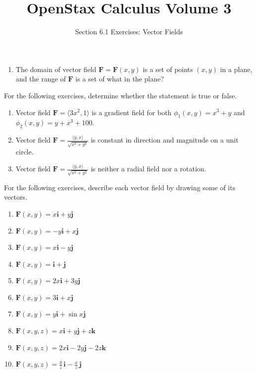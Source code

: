 \documentclass{exercises}
\title{OpenStax Calculus Volume 3}
\subtitle{Section 6.1 Exercises: Vector Fields}
\author{}
\date{}
\begin{document}
\maketitle

\begin{enumerate}[start=1]
\item The domain of vector field $\mathbf{F}=\mathbf{F}(x,y)$ is a set of points $(x,y)$ in a plane, and the range of $\mathbf{F}$ is a set of what in the plane?
\end{enumerate}

For the following exercises, determine whether the statement is true or false.

\begin{enumerate}[resume]
\item Vector field $\mathbf{F}=\langle3x^{2},1\rangle$ is a gradient field for both $\phi_{1}(x,y)=x^{3}+y$ and $\phi_{2}(x,y)=y+x^{3}+100$.
\item Vector field $\mathbf{F}=\frac{\langle y,x\rangle}{\sqrt{x^{2}+y^{2}}}$ is constant in direction and magnitude on a unit circle.
\item Vector field $\mathbf{F}=\frac{\langle y,x\rangle}{\sqrt{x^{2}+y^{2}}}$ is neither a radial field nor a rotation.
\end{enumerate}

For the following exercises, describe each vector field by drawing some of its vectors.

\begin{enumerate}[resume]
\item \techrequired $\mathbf{F}(x,y)=x\mathbf{i}+y\mathbf{j}$
\item \techrequired $\mathbf{F}(x,y)=-y\mathbf{i}+x\mathbf{j}$
\item \techrequired $\mathbf{F}(x,y)=x\mathbf{i}-y\mathbf{j}$
\item \techrequired $\mathbf{F}(x,y)=\mathbf{i}+\mathbf{j}$
\item \techrequired $\mathbf{F}(x,y)=2x\mathbf{i}+3y\mathbf{j}$
\item \techrequired $\mathbf{F}(x,y)=3\mathbf{i}+x\mathbf{j}$
\item \techrequired $\mathbf{F}(x,y)=y\mathbf{i}+\sin x\mathbf{j}$
\item \techrequired $\mathbf{F}(x,y,z)=x\mathbf{i}+y\mathbf{j}+z\mathbf{k}$
\item \techrequired $\mathbf{F}(x,y,z)=2x\mathbf{i}-2y\mathbf{j}-2z\mathbf{k}$
\item \techrequired $\mathbf{F}(x,y,z)=\frac{y}{z}\,\mathbf{i}-\frac{x}{z}\,\mathbf{j}$
\end{enumerate}
\end{document}
